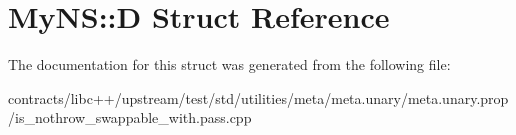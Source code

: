 \hypertarget{struct_my_n_s_1_1_d}{}\section{My\+NS\+:\+:D Struct Reference}
\label{struct_my_n_s_1_1_d}


The documentation for this struct was generated from the following file\+:\begin{DoxyCompactItemize}
\item 
contracts/libc++/upstream/test/std/utilities/meta/meta.\+unary/meta.\+unary.\+prop/is\+\_\+nothrow\+\_\+swappable\+\_\+with.\+pass.\+cpp\end{DoxyCompactItemize}
